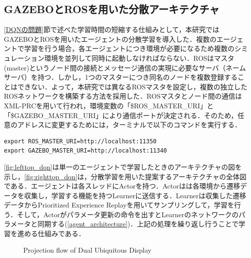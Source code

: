 \documentclass[12pt]{sonota/aislab}
\begin{document}
\subsection{GAZEBOとROSを用いた分散アーキテクチャ}
\ref{DQNの問題}節で述べた学習時間の短縮する仕組みとして，本研究ではGAZEBOとROSを用いたエージェントの分散学習を導入した．複数のエージェントで学習を行う場合，各エージェントにつき環境が必要になるため複数のシミュレーション環境を並列して同時に起動しなければならない．ROSはマスタ(master)というノード間の接続とメッセージ通信の実現に必要なサーバ（ネームサーバ）を持つ．しかし，1つのマスターにつき同名のノードを複数登録することはできない．よって，本研究では異なるROSマスタを設定し，複数の独立したROSネットワークを構築する方法を採用した．ROSマスタとノード間の通信はXML-PRCを用いて行われ，環境変数の「\$ROS\_MASTER\_URI」と「\$GAZEBO\_MASTER\_URI」により通信ポートが決定される．そのため，任意のアドレスに変更するためには，ターミナルで以下のコマンドを実行する．

\begin{lstlisting}
export ROS_MASTER_URI=http://localhost:11350
export GAZEBO_MASTER_URI=http://localhost:11340
\end{lstlisting}

\ref{fig:lefttop_dqn}は単一のエージェントで学習したときのアーキテクチャの図を示し，\ref{fig:righttop_dqn}は，分散学習を用いた提案するアーキテクチャの全体図である．エージェントは各スレッドにActorを持つ．Actorはは各環境から遷移データを収集し，学習する機能を持つLearnerに送信する．Learnerは収集した遷移データからPrioritized Experience Replayを用いてサンプリングして，学習を行う．そして，Actorがパラメータ更新の命令を出すとLearnerのネットワークのパラメータと同期する(\ref{agent_architecture})．上記の処理を繰り返し行うことで学習を進める仕組みである．

\begin{figure}[tbp]

	\begin{center}
	\hspace{10mm}
	\end{center}
	
	\caption{Projection flow of Dual Ubiquitous Display}
	\label{fig:twofig_dqn}
\end{figure}
\end{document}
